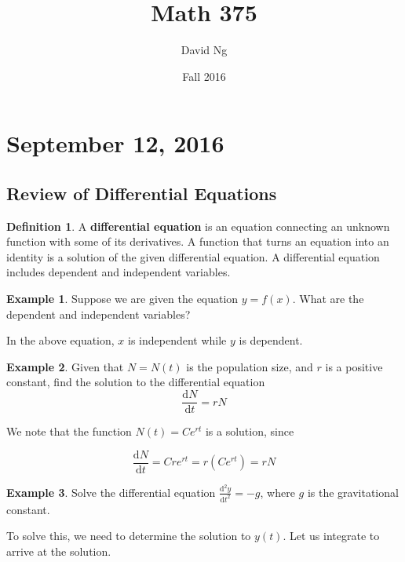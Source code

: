 \documentclass[11pt]{article}
\theoremstyle{plain} %
\theoremstyle{definition}
\newtheorem*{definition}{Definition} %
\theoremstyle{example}
\newtheorem*{example}{Example}
\theoremstyle{remark}
\begin{document}
\title{Math 375}
\author{David Ng}
\date{Fall 2016}
\maketitle

\tableofcontents

\eject


\section{September 12, 2016}
\subsection{Review of Differential Equations}
 \begin{definition}
 A \textbf{differential equation} is an equation connecting an unknown function with some of its derivatives.  A function that turns an equation into an identity is a solution of the given differential equation. A differential equation includes dependent and independent variables. 

 \end{definition}
 
 
 \begin{example}
 Suppose we are given the equation $y=f(x)$. What are the dependent and independent variables?
 \end{example}

 In the above equation, $x$ is independent while $y$ is dependent. 
 
 \begin{example}
Given that $N=N(t)$ is the population size, and $r$ is a positive constant, find the solution to the differential equation $$\frac{\mathrm d N}{\mathrm d t} = rN$$ 
 \end{example}

We note that the function $N(t) = Ce^{rt}$ is a solution, since

$$\frac{\mathrm d N}{\mathrm d t} = Cre^{rt} = r\left(Ce^{rt}\right) = rN$$

\begin{example}
Solve the differential equation $\frac{\mathrm d^2y}{\mathrm d t^2} = -g$, where $g$ is the gravitational constant.
\end{example}

To solve this, we need to determine the solution to $y(t)$. Let us integrate to arrive at the solution.
\end{document}
